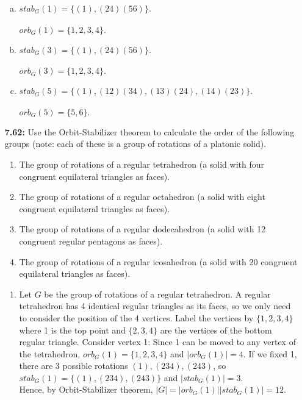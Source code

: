 \documentclass[11pt, one side]{article}
\begin{document}
\begin{enumerate}
\begin{enumerate}[a)]
\item $stab_G(1)=\{(1), (24)(56)\}.$\\ \\    
      $orb_G(1)=\{1, 2, 3, 4\}.$ \\
      
\item $stab_G(3)=\{(1), (24)(56)\}.$\\ \\
      $orb_G(3)=\{1, 2, 3, 4\}.$ \\
      
\item $stab_G(5)=\{(1), (12)(34), (13)(24), (14)(23)\}.$\\ \\
      $orb_G(5)=\{5, 6\}.$

\end {enumerate}

\pagebreak

\item [{\bf 7.62:}]  Use the Orbit-Stabilizer theorem to calculate the order of the following groups (note: each of these is a group of rotations of a platonic solid). 

\begin{enumerate}
\item The group of rotations of a regular tetrahedron (a solid with four congruent equilateral triangles as faces).
\item The group of rotations of a regular octahedron (a solid with eight congruent equilateral triangles as faces).
\item The group of rotations of a regular dodecahedron (a solid with 12 congruent regular pentagons as faces).
\item The group of rotations of a regular icosahedron (a solid with 20 congruent equilateral triangles as faces).
\end{enumerate}

\begin{enumerate}

\item Let $G$ be the group of rotations of a regular tetrahedron. A regular tetrahedron has 4 identical regular triangles as its faces, so we only need to consider the position of the 4 vertices. Label the vertices by $\{1, 2, 3, 4\}$ where 1 is the top point and $\{2, 3, 4\}$ are the vertices of the bottom regular triangle. Consider vertex 1: 
Since 1 can be moved to any vertex of the tetrahedron, $orb_G(1)=\{1, 2, 3, 4\}$ and $|orb_G(1)| = 4.$ If we fixed 1, there are 3 possible rotations $(1), (234), (243)$, so $stab_G(1)=\{(1), (234), (243)\}$ and $|stab_G(1)|=3.$\\
Hence, by Orbit-Stabilizer theorem, $|G|=|orb_G(1)||stab_G(1)|=12.$\\


\end{enumerate}
\end{enumerate}
\end{document}
